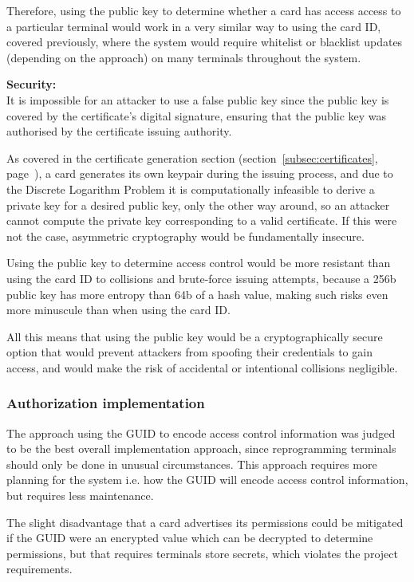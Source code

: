 \documentclass[12pt]{article}
\begin{document}
Therefore, using the public key to determine whether a card has access access to a particular terminal would work in a very similar way to using the card ID, covered previously, where the system would require whitelist or blacklist updates (depending on the approach) on many terminals throughout the system.



\textbf{Security:}\\
It is impossible for an attacker to use a false public key since the public key is covered by the certificate's digital signature, ensuring that the public key was authorised by the certificate issuing authority. 

As covered in the certificate generation section (section~\ref{subsec:certificates}, page~\pageref{subsec:certificates}), a card generates its own keypair during the issuing process, and due to the Discrete Logarithm Problem it is computationally infeasible to derive a private key for a desired public key, only the other way around, so an attacker cannot compute the private key corresponding to a valid certificate. If this were not the case, asymmetric cryptography would be fundamentally insecure. 

Using the public key to determine access control would be more resistant than using the card ID to collisions and brute-force issuing attempts, because a 256b public key has more entropy than 64b of a hash value, making such risks even more minuscule than when using the card ID.

All this means that using the public key would be a cryptographically secure option that would prevent attackers from spoofing their credentials to gain access, and would make the risk of accidental or intentional collisions negligible.


\subsubsection{Authorization implementation}
The approach using the GUID to encode access control information was judged to be the best overall implementation approach, since reprogramming terminals should only be done in unusual circumstances. This approach requires more planning for the system i.e. how the GUID will encode access control information, but requires less maintenance.

The slight disadvantage that a card advertises its permissions could be mitigated if the GUID were an encrypted value which can be decrypted to determine permissions, but that requires terminals store secrets, which violates the project requirements.
\end{document}
